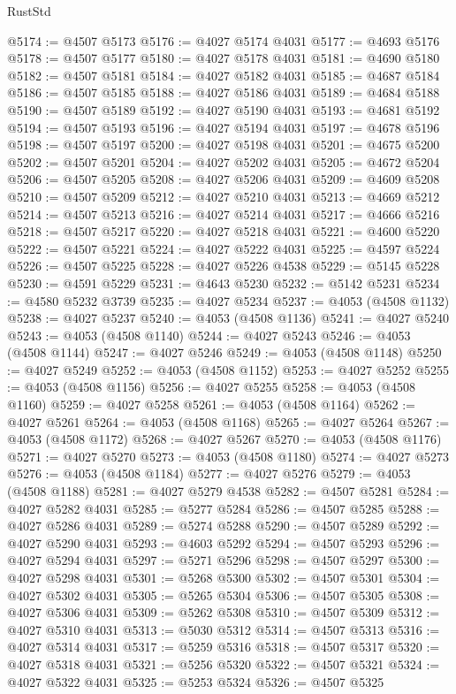 \begin{lexlean}{RustStd}
\begin{coremodule}
@5174 := @4507 @5173
@5176 := @4027 @5174 @4031
@5177 := @4693 @5176
@5178 := @4507 @5177
@5180 := @4027 @5178 @4031
@5181 := @4690 @5180
@5182 := @4507 @5181
@5184 := @4027 @5182 @4031
@5185 := @4687 @5184
@5186 := @4507 @5185
@5188 := @4027 @5186 @4031
@5189 := @4684 @5188
@5190 := @4507 @5189
@5192 := @4027 @5190 @4031
@5193 := @4681 @5192
@5194 := @4507 @5193
@5196 := @4027 @5194 @4031
@5197 := @4678 @5196
@5198 := @4507 @5197
@5200 := @4027 @5198 @4031
@5201 := @4675 @5200
@5202 := @4507 @5201
@5204 := @4027 @5202 @4031
@5205 := @4672 @5204
@5206 := @4507 @5205
@5208 := @4027 @5206 @4031
@5209 := @4609 @5208
@5210 := @4507 @5209
@5212 := @4027 @5210 @4031
@5213 := @4669 @5212
@5214 := @4507 @5213
@5216 := @4027 @5214 @4031
@5217 := @4666 @5216
@5218 := @4507 @5217
@5220 := @4027 @5218 @4031
@5221 := @4600 @5220
@5222 := @4507 @5221
@5224 := @4027 @5222 @4031
@5225 := @4597 @5224
@5226 := @4507 @5225
@5228 := @4027 @5226 @4538
@5229 := @5145 @5228
@5230 := @4591 @5229
@5231 := @4643 @5230
@5232 := @5142 @5231
@5234 := @4580 @5232 @3739
@5235 := @4027 @5234
@5237 := @4053 (@4508 @1132)
@5238 := @4027 @5237
@5240 := @4053 (@4508 @1136)
@5241 := @4027 @5240
@5243 := @4053 (@4508 @1140)
@5244 := @4027 @5243
@5246 := @4053 (@4508 @1144)
@5247 := @4027 @5246
@5249 := @4053 (@4508 @1148)
@5250 := @4027 @5249
@5252 := @4053 (@4508 @1152)
@5253 := @4027 @5252
@5255 := @4053 (@4508 @1156)
@5256 := @4027 @5255
@5258 := @4053 (@4508 @1160)
@5259 := @4027 @5258
@5261 := @4053 (@4508 @1164)
@5262 := @4027 @5261
@5264 := @4053 (@4508 @1168)
@5265 := @4027 @5264
@5267 := @4053 (@4508 @1172)
@5268 := @4027 @5267
@5270 := @4053 (@4508 @1176)
@5271 := @4027 @5270
@5273 := @4053 (@4508 @1180)
@5274 := @4027 @5273
@5276 := @4053 (@4508 @1184)
@5277 := @4027 @5276
@5279 := @4053 (@4508 @1188)
@5281 := @4027 @5279 @4538
@5282 := @4507 @5281
@5284 := @4027 @5282 @4031
@5285 := @5277 @5284
@5286 := @4507 @5285
@5288 := @4027 @5286 @4031
@5289 := @5274 @5288
@5290 := @4507 @5289
@5292 := @4027 @5290 @4031
@5293 := @4603 @5292
@5294 := @4507 @5293
@5296 := @4027 @5294 @4031
@5297 := @5271 @5296
@5298 := @4507 @5297
@5300 := @4027 @5298 @4031
@5301 := @5268 @5300
@5302 := @4507 @5301
@5304 := @4027 @5302 @4031
@5305 := @5265 @5304
@5306 := @4507 @5305
@5308 := @4027 @5306 @4031
@5309 := @5262 @5308
@5310 := @4507 @5309
@5312 := @4027 @5310 @4031
@5313 := @5030 @5312
@5314 := @4507 @5313
@5316 := @4027 @5314 @4031
@5317 := @5259 @5316
@5318 := @4507 @5317
@5320 := @4027 @5318 @4031
@5321 := @5256 @5320
@5322 := @4507 @5321
@5324 := @4027 @5322 @4031
@5325 := @5253 @5324
@5326 := @4507 @5325

\end{coremodule}
\end{lexlean}
